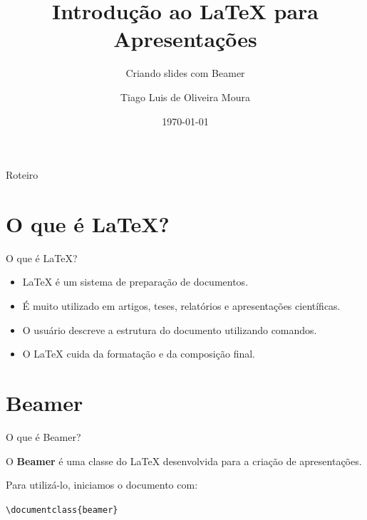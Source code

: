 \documentclass{beamer}
\title{Introdução ao LaTeX para Apresentações}
\subtitle{Criando slides com Beamer}
\author{Tiago Luis de Oliveira Moura}
\date{\today}
\begin{document}

\begin{frame}
    \titlepage
\end{frame}


\begin{frame}{Roteiro}
    \tableofcontents
\end{frame}

\section{O que é LaTeX?}

\begin{frame}{O que é LaTeX?}

    \begin{itemize}
        \item LaTeX é um sistema de preparação de documentos.
        \item É muito utilizado em artigos, teses, relatórios e apresentações científicas.
        \item O usuário descreve a estrutura do documento utilizando comandos.
        \item O LaTeX cuida da formatação e da composição final.
    \end{itemize}

\end{frame}

\section{Beamer}

\begin{frame}{O que é Beamer?}

    O \textbf{Beamer} é uma classe do LaTeX desenvolvida para a criação de apresentações.

    \vspace{0.5cm}

    Para utilizá-lo, iniciamos o documento com:

    \vspace{0.3cm}

    \begin{center}
        \texttt{\textbackslash documentclass\{beamer\}}
    \end{center}

\end{frame}
\end{document}
